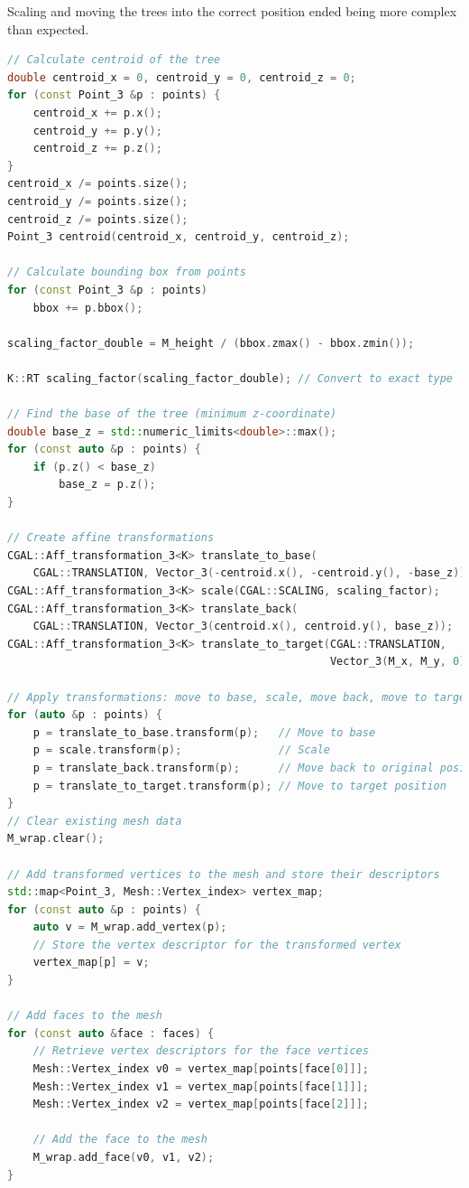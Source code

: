 \documentclass[12pt]{article}
\begin{document}
Scaling and moving the trees into the correct position ended being more complex
than expected. \\

\begin{lstlisting}[language=C++]
// Calculate centroid of the tree
double centroid_x = 0, centroid_y = 0, centroid_z = 0;
for (const Point_3 &p : points) {
    centroid_x += p.x();
    centroid_y += p.y();
    centroid_z += p.z();
}
centroid_x /= points.size();
centroid_y /= points.size();
centroid_z /= points.size();
Point_3 centroid(centroid_x, centroid_y, centroid_z);

// Calculate bounding box from points
for (const Point_3 &p : points)
    bbox += p.bbox();

scaling_factor_double = M_height / (bbox.zmax() - bbox.zmin());

K::RT scaling_factor(scaling_factor_double); // Convert to exact type

// Find the base of the tree (minimum z-coordinate)
double base_z = std::numeric_limits<double>::max();
for (const auto &p : points) {
    if (p.z() < base_z)
        base_z = p.z();
}

// Create affine transformations
CGAL::Aff_transformation_3<K> translate_to_base(
    CGAL::TRANSLATION, Vector_3(-centroid.x(), -centroid.y(), -base_z));
CGAL::Aff_transformation_3<K> scale(CGAL::SCALING, scaling_factor);
CGAL::Aff_transformation_3<K> translate_back(
    CGAL::TRANSLATION, Vector_3(centroid.x(), centroid.y(), base_z));
CGAL::Aff_transformation_3<K> translate_to_target(CGAL::TRANSLATION,
                                                  Vector_3(M_x, M_y, 0));

// Apply transformations: move to base, scale, move back, move to target
for (auto &p : points) {
    p = translate_to_base.transform(p);   // Move to base
    p = scale.transform(p);               // Scale
    p = translate_back.transform(p);      // Move back to original position
    p = translate_to_target.transform(p); // Move to target position
}
// Clear existing mesh data
M_wrap.clear();

// Add transformed vertices to the mesh and store their descriptors
std::map<Point_3, Mesh::Vertex_index> vertex_map;
for (const auto &p : points) {
    auto v = M_wrap.add_vertex(p);
    // Store the vertex descriptor for the transformed vertex
    vertex_map[p] = v;
}

// Add faces to the mesh
for (const auto &face : faces) {
    // Retrieve vertex descriptors for the face vertices
    Mesh::Vertex_index v0 = vertex_map[points[face[0]]];
    Mesh::Vertex_index v1 = vertex_map[points[face[1]]];
    Mesh::Vertex_index v2 = vertex_map[points[face[2]]];

    // Add the face to the mesh
    M_wrap.add_face(v0, v1, v2);
}
\end{lstlisting}
\end{document}
